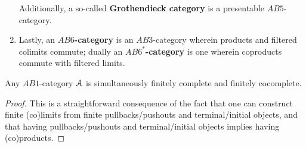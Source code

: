 \begin{definition}
\begin{enumerate}
                                Additionally, a so-called \textbf{Grothendieck category} is a presentable $AB5$-category.
                                \item Lastly, an \textbf{$AB6$-category} is an $AB3$-category wherein products and filtered colimits commute; dually an \textbf{$AB6^*$-category} is one wherein coproducts commute with filtered limits.
                            \end{enumerate}
                    \end{definition}
                    
                    \begin{proposition} \label{prop: AB1_categories_are_finitely_(co)complete}
                        Any $AB1$-category $\mathcal{A}$ is simultaneously finitely complete and finitely cocomplete.
                    \end{proposition}
                        \begin{proof}
                            This is a straightforward consequence of the fact that one can construct finite (co)limits from finite pullbacks/pushouts and terminal/initial objects, and that having pullbacks/pushouts and terminal/initial objects implies having (co)products.
                        \end{proof}
                    
